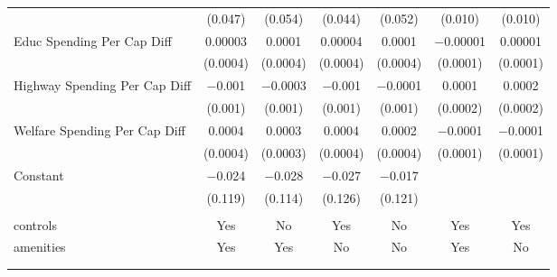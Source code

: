 \begin{table}[!htbp]
\begin{tabular}{@{\extracolsep{5pt}}lcccccc}
  & (0.047) & (0.054) & (0.044) & (0.052) & (0.010) & (0.010) \\ 
  Educ Spending Per Cap Diff & 0.00003 & 0.0001 & 0.00004 & 0.0001 & $-$0.00001 & 0.00001 \\ 
  & (0.0004) & (0.0004) & (0.0004) & (0.0004) & (0.0001) & (0.0001) \\ 
  Highway Spending Per Cap Diff & $-$0.001 & $-$0.0003 & $-$0.001 & $-$0.0001 & 0.0001 & 0.0002 \\ 
  & (0.001) & (0.001) & (0.001) & (0.001) & (0.0002) & (0.0002) \\ 
  Welfare Spending Per Cap Diff & 0.0004 & 0.0003 & 0.0004 & 0.0002 & $-$0.0001 & $-$0.0001 \\ 
  & (0.0004) & (0.0003) & (0.0004) & (0.0004) & (0.0001) & (0.0001) \\ 
  Constant & $-$0.024 & $-$0.028 & $-$0.027 & $-$0.017 &  &  \\ 
  & (0.119) & (0.114) & (0.126) & (0.121) &  &  \\ 
 \hline \\[-1.8ex] 
controls & Yes & No & Yes & No & Yes & Yes \\ 
amenities & Yes & Yes & No & No & Yes & No \\ 
\hline \\[-1.8ex] 
\hline 
\hline \\[-1.8ex] 
\end{tabular} 
\end{table} 
